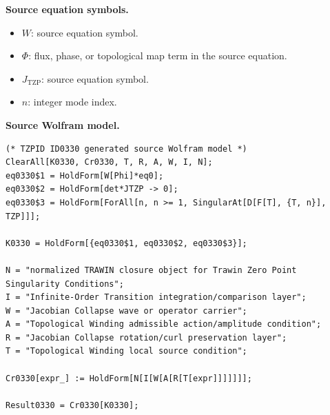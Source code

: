 \begin{minipage}[t]{0.49\linewidth}
\begingroup
\small
\raggedright
\textbf{Source equation symbols.}\par
\begin{itemize}[leftmargin=1.35em,itemsep=1pt,topsep=1pt,parsep=0pt]
    \item $W$: source equation symbol.
    \item $\Phi$: flux, phase, or topological map term in the source equation.
    \item $J_{\mathrm{TZP}}$: source equation symbol.
    \item $n$: integer mode index.
\end{itemize}
\endgroup
\end{minipage}\hfill
\begin{minipage}[t]{0.47\linewidth}
\begingroup
\scriptsize
\raggedright
\textbf{Source Wolfram model.}\par
\begin{Verbatim}[fontsize=\tiny,breaklines=true,breakanywhere=true]
(* TZPID ID0330 generated source Wolfram model *)
ClearAll[K0330, Cr0330, T, R, A, W, I, N];
eq0330$1 = HoldForm[W[Phi]*eq0];
eq0330$2 = HoldForm[det*JTZP -> 0];
eq0330$3 = HoldForm[ForAll[n, n >= 1, SingularAt[D[F[T], {T, n}], TZP]]];

K0330 = HoldForm[{eq0330$1, eq0330$2, eq0330$3}];

N = "normalized TRAWIN closure object for Trawin Zero Point Singularity Conditions";
I = "Infinite-Order Transition integration/comparison layer";
W = "Jacobian Collapse wave or operator carrier";
A = "Topological Winding admissible action/amplitude condition";
R = "Jacobian Collapse rotation/curl preservation layer";
T = "Topological Winding local source condition";

Cr0330[expr_] := HoldForm[N[I[W[A[R[T[expr]]]]]]];

Result0330 = Cr0330[K0330];
\end{Verbatim}
\endgroup
\end{minipage}

